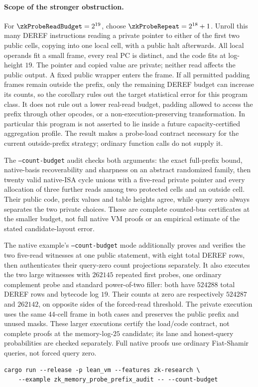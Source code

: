 \paragraph{Scope of the stronger obstruction.} For $\zkProbeReadBudget=2^{19}$, choose $\zkProbeRepeat=2^{18}+1$. Unroll this many DEREF instructions reading a private pointer to either of the first two public cells, copying into one local cell, with a public halt afterwards. All local operands fit a small frame, every real PC is distinct, and the code fits at log-height $19$. The pointer and copied value are private; neither read affects the public output. A fixed public wrapper enters the frame. If all permitted padding frames remain outside the prefix, only the remaining DEREF budget can increase its counts, so the corollary rules out the target statistical error for this program class. It does not rule out a lower real-read budget, padding allowed to access the prefix through other opcodes, or a non-execution-preserving transformation. In particular this program is not asserted to lie inside a future capacity-certified aggregation profile. The result makes a probe-load contract necessary for the current outside-prefix strategy; ordinary function calls do not supply it.

The \texttt{--count-budget} audit checks both arguments: the exact full-prefix bound, native-basis recoverability and sharpness on an abstract randomized family, then twenty valid native-ISA cycle unions with a five-read private pointer and every allocation of three further reads among two protected cells and an outside cell. Their public code, prefix values and table heights agree, while query zero always separates the two private choices. These are complete counted-bus certificates at the smaller budget, not full native VM proofs or an empirical estimate of the stated candidate-layout error.

The native example's \texttt{--count-budget} mode additionally proves and verifies the two five-read witnesses at one public statement, with eight total DEREF rows, then authenticates their query-zero count projections separately. It also executes the two large witnesses with $262145$ repeated first probes, one ordinary complement probe and standard power-of-two filler: both have $524288$ total DEREF rows and bytecode log $19$. Their counts at zero are respectively $524287$ and $262142$, on opposite sides of the forced-read threshold. The private execution uses the same $44$-cell frame in both cases and preserves the public prefix and unused masks. These larger executions certify the load/code contract, not complete proofs at the memory-log-$25$ candidate; its lane and honest-query probabilities are checked separately. Full native proofs use ordinary Fiat-Shamir queries, not forced query zero.
\begin{verbatim}
cargo run --release -p lean_vm --features zk-research \
    --example zk_memory_probe_prefix_audit -- --count-budget
\end{verbatim}

